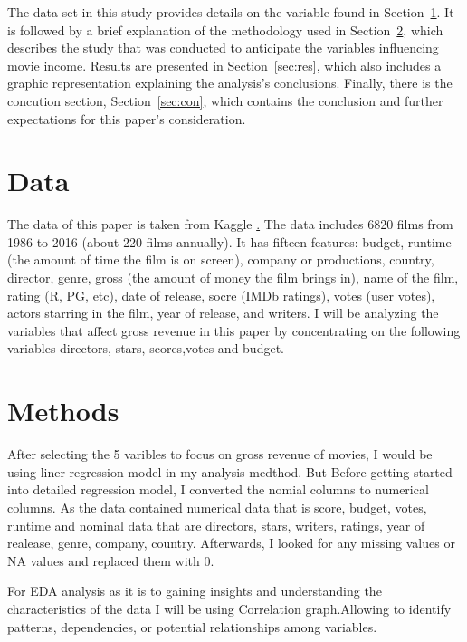 \documentclass[12pt]{article}
\begin{document}
The data set in this study provides details on the variable found in Section~\ref{sec:data}.  
It is followed by a brief explanation of the methodology used in Section~\ref{sec:meth}, 
which describes the study that was conducted to anticipate the variables influencing movie 
income. Results are presented in Section~\ref{sec:res}, which also includes a graphic representation
explaining the analysis's conclusions. Finally, there is the concution section, 
Section~\ref{sec:con}, which contains the conclusion and further expectations for this
paper's consideration.

\section{Data}
\label{sec:data}

The data of this paper is taken from Kaggle \href{https://www.kaggle.com/datasets/danielgrijalvas/movies}. 
The data includes 6820 films from 1986 to 2016 (about 220 films annually). It has
fifteen features: budget, runtime (the amount of time the film is on screen), company 
or productions, country, director, genre, gross (the amount of money the film brings in), 
name of the film, rating (R, PG, etc), date of release, socre (IMDb ratings), votes (user votes), actors starring in the
film, year of release, and writers. I will be analyzing the variables that affect
gross revenue in this paper by concentrating on the following variables directors, stars, scores,votes and budget.

\section{Methods}
\label{sec:meth}

After selecting the 5 varibles to focus on gross revenue of movies, I would be using
liner regression model in my analysis medthod. But Before getting started into detailed 
regression model, I converted the nomial columns to numerical columns. As the data contained 
numerical data that is score, budget, votes, runtime and nominal data that are directors, 
stars, writers, ratings, year of realease, genre, company, country. Afterwards, I looked 
for any missing values or NA values and replaced them with 0.

For EDA analysis as it is to gaining insights and understanding the characteristics 
of the data I will be using Correlation graph.Allowing to identify patterns, dependencies,
or potential relationships among variables.
\end{document}
